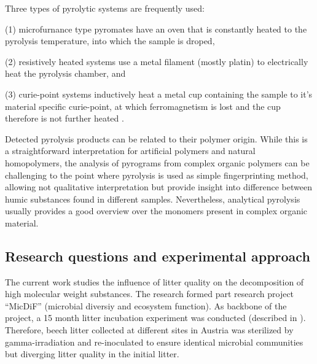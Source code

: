 Three types of pyrolytic systems are frequently used: 

(1) microfurnance type pyromates have an oven that is constantly heated to the pyrolysis temperature, into which the sample is droped,

(2) resistively heated systems use a metal filament (mostly platin) to electrically heat the pyrolysis chamber, and

(3) curie-point systems inductively heat a metal cup containing the sample to it's material specific curie-point, at which ferromagnetism is lost and the cup therefore is not further heated \citep{Sobeih2008}. 

Detected pyrolysis products can be related to their polymer origin. While this is a straightforward interpretation for artificial polymers and natural homopolymers, the analysis of pyrograms from complex organic polymers can be challenging to the point where pyrolysis is used as simple fingerprinting method, allowing not qualitative interpretation but provide insight into difference between humic substances found in different samples. Nevertheless, analytical pyrolysis usually provides a good overview over the monomers present in complex organic material.

\subsection{Research questions and experimental approach}

The current work studies the influence of litter quality on the decomposition of high molecular weight substances. The research formed part research project ``MicDiF'' (microbial diversiy and ecosystem function). As backbone of the project, a 15 month litter incubation experiment was conducted (described in \cite{Wanek2010}). Therefore, beech litter collected at different sites in Austria was sterilized by gamma-irradiation and re-inoculated to ensure identical microbial communities but diverging litter quality in the initial litter. 






